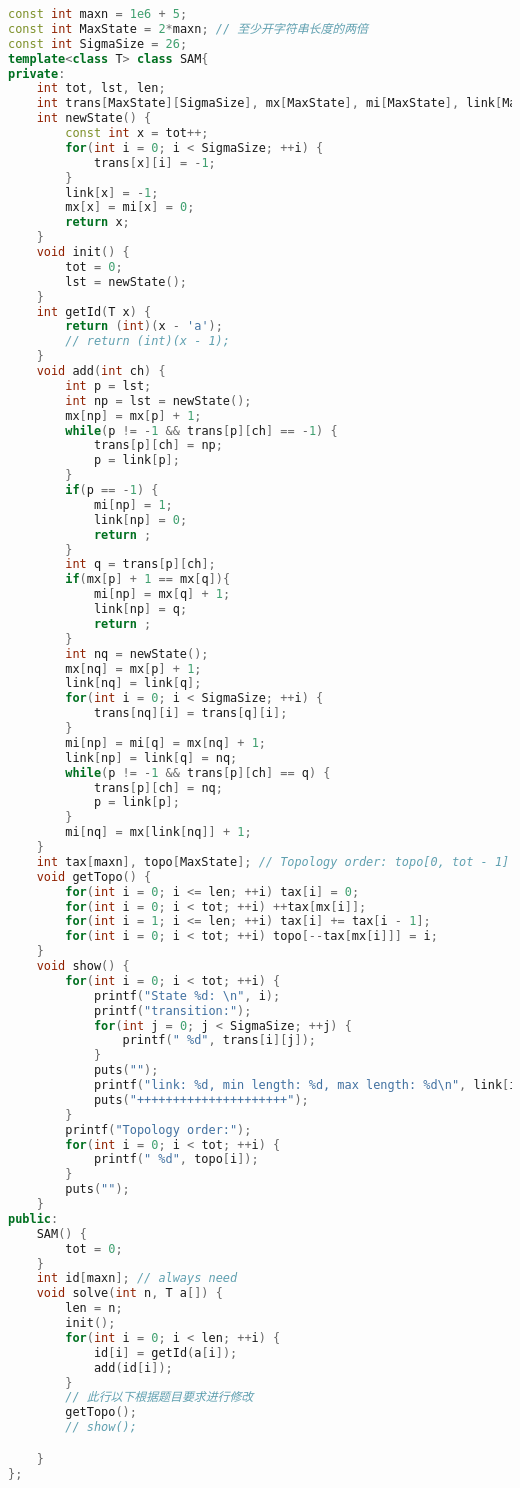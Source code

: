 \begin{lstlisting}[language=C++]
const int maxn = 1e6 + 5;
const int MaxState = 2*maxn; // 至少开字符串长度的两倍
const int SigmaSize = 26;
template<class T> class SAM{
private:
    int tot, lst, len;
    int trans[MaxState][SigmaSize], mx[MaxState], mi[MaxState], link[MaxState];
    int newState() {
        const int x = tot++;
        for(int i = 0; i < SigmaSize; ++i) {
            trans[x][i] = -1;
        }
        link[x] = -1;
        mx[x] = mi[x] = 0;
        return x;
    }
    void init() {
        tot = 0;
        lst = newState();
    }
    int getId(T x) {
        return (int)(x - 'a');
        // return (int)(x - 1);
    }
    void add(int ch) {
        int p = lst;
        int np = lst = newState();
        mx[np] = mx[p] + 1;
        while(p != -1 && trans[p][ch] == -1) {
            trans[p][ch] = np;
            p = link[p];
        }
        if(p == -1) {
            mi[np] = 1;
            link[np] = 0;
            return ;
        }
        int q = trans[p][ch];
        if(mx[p] + 1 == mx[q]){
            mi[np] = mx[q] + 1;
            link[np] = q;
            return ;
        }
        int nq = newState();
        mx[nq] = mx[p] + 1;
        link[nq] = link[q];
        for(int i = 0; i < SigmaSize; ++i) {
            trans[nq][i] = trans[q][i];
        }
        mi[np] = mi[q] = mx[nq] + 1;
        link[np] = link[q] = nq;
        while(p != -1 && trans[p][ch] == q) {
            trans[p][ch] = nq;
            p = link[p];
        }
        mi[nq] = mx[link[nq]] + 1;
    }
    int tax[maxn], topo[MaxState]; // Topology order: topo[0, tot - 1]
    void getTopo() {
        for(int i = 0; i <= len; ++i) tax[i] = 0;
        for(int i = 0; i < tot; ++i) ++tax[mx[i]];
        for(int i = 1; i <= len; ++i) tax[i] += tax[i - 1];
        for(int i = 0; i < tot; ++i) topo[--tax[mx[i]]] = i;
    }
    void show() {
        for(int i = 0; i < tot; ++i) {
            printf("State %d: \n", i);
            printf("transition:");
            for(int j = 0; j < SigmaSize; ++j) {
                printf(" %d", trans[i][j]);
            }
            puts("");
            printf("link: %d, min length: %d, max length: %d\n", link[i], mi[i], mx[i]);
            puts("+++++++++++++++++++++");
        }
        printf("Topology order:");
        for(int i = 0; i < tot; ++i) {
            printf(" %d", topo[i]);
        }
        puts("");
    }
public:
    SAM() {
        tot = 0;
    }
    int id[maxn]; // always need
    void solve(int n, T a[]) {
        len = n;
        init();
        for(int i = 0; i < len; ++i) {
            id[i] = getId(a[i]);
            add(id[i]);
        }
        // 此行以下根据题目要求进行修改
        getTopo();
        // show();

    }
};
\end{lstlisting}

